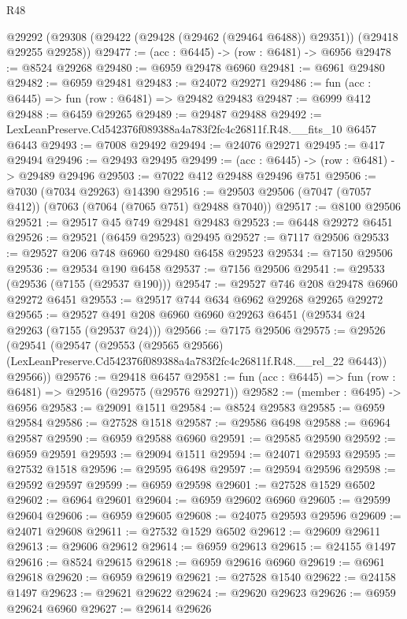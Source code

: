 \begin{lexlean}{R48}
\begin{coremodule}
  @29292 (@29308 (@29422 (@29428 (@29462 (@29464 @6488)) @29351)) (@29418 @29255 @29258))
@29477 := (acc : @6445) -> (row : @6481) -> @6956
@29478 := @8524 @29268
@29480 := @6959 @29478 @6960
@29481 := @6961 @29480
@29482 := @6959 @29481
@29483 := @24072 @29271
@29486 := fun (acc : @6445) => fun (row : @6481) => @29482 @29483
@29487 := @6999 @412
@29488 := @6459 @29265
@29489 := @29487 @29488
@29492 := LexLeanPreserve.Cd542376f089388a4a783f2fc4c26811f.R48.__fits_10 @6457 @6443
@29493 := @7008 @29492
@29494 := @24076 @29271
@29495 := @417 @29494
@29496 := @29493 @29495
@29499 := (acc : @6445) -> (row : @6481) -> @29489 @29496
@29503 := @7022 @412 @29488 @29496 @751
@29506 := @7030 (@7034 @29263) @14390
@29516 := @29503 @29506 (@7047 (@7057 @412)) (@7063 (@7064 (@7065 @751) @29488 @7040))
@29517 := @8100 @29506
@29521 := @29517 @45 @749 @29481 @29483
@29523 := @6448 @29272 @6451
@29526 := @29521 (@6459 @29523) @29495
@29527 := @7117 @29506
@29533 := @29527 @206 @748 @6960 @29480 @6458 @29523
@29534 := @7150 @29506
@29536 := @29534 @190 @6458
@29537 := @7156 @29506
@29541 := @29533 (@29536 (@7155 (@29537 @190)))
@29547 := @29527 @746 @208 @29478 @6960 @29272 @6451
@29553 := @29517 @744 @634 @6962 @29268 @29265 @29272
@29565 := @29527 @491 @208 @6960 @6960 @29263 @6451 (@29534 @24 @29263 (@7155 (@29537 @24)))
@29566 := @7175 @29506
@29575 := @29526
    (@29541
      (@29547
        (@29553
          (@29565 @29566)
          (LexLeanPreserve.Cd542376f089388a4a783f2fc4c26811f.R48.__rel_22 @6443))
        @29566))
@29576 := @29418 @6457
@29581 := fun (acc : @6445) => fun (row : @6481) => @29516 (@29575 (@29576 @29271))
@29582 := (member : @6495) -> @6956
@29583 := @29091 @1511
@29584 := @8524 @29583
@29585 := @6959 @29584
@29586 := @27528 @1518
@29587 := @29586 @6498
@29588 := @6964 @29587
@29590 := @6959 @29588 @6960
@29591 := @29585 @29590
@29592 := @6959 @29591
@29593 := @29094 @1511
@29594 := @24071 @29593
@29595 := @27532 @1518
@29596 := @29595 @6498
@29597 := @29594 @29596
@29598 := @29592 @29597
@29599 := @6959 @29598
@29601 := @27528 @1529 @6502
@29602 := @6964 @29601
@29604 := @6959 @29602 @6960
@29605 := @29599 @29604
@29606 := @6959 @29605
@29608 := @24075 @29593 @29596
@29609 := @24071 @29608
@29611 := @27532 @1529 @6502
@29612 := @29609 @29611
@29613 := @29606 @29612
@29614 := @6959 @29613
@29615 := @24155 @1497
@29616 := @8524 @29615
@29618 := @6959 @29616 @6960
@29619 := @6961 @29618
@29620 := @6959 @29619
@29621 := @27528 @1540
@29622 := @24158 @1497
@29623 := @29621 @29622
@29624 := @29620 @29623
@29626 := @6959 @29624 @6960
@29627 := @29614 @29626

\end{coremodule}
\end{lexlean}
